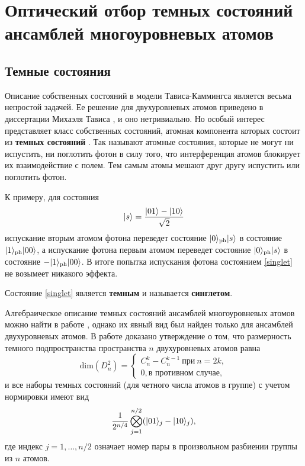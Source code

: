 \chapter{Оптический отбор темных состояний ансамблей многоуровневых атомов}\label{ch:ch3}

\section{Темные состояния}\label{subsec:ch3/sect1}

Описание собственных состояний в модели Тависа-Каммингса является весьма непростой задачей. Ее решение для двухуровневых атомов приведено в диссертации Михаэля Тависа \cite{tc_a_study}, и оно нетривиально. Но особый интерес представляет класс собственных состояний, атомная компонента которых состоит из \textbf{темных состояний} \cite{dark_states_dimension}. Так называют атомные состояния, которые не могут ни испустить, ни поглотить фотон в силу того, что интерференция атомов блокирует их взаимодействие с полем. Тем самым атомы мешают друг другу испустить или поглотить фотон.

К примеру, для состояния
\begin{equation}\label{singlet}
	|s\rangle = \frac{|01\rangle - |10\rangle}{\sqrt{2}}
\end{equation}
испускание вторым атомом фотона переведет состояние  $|0\rangle_{\text{ph}}|s\rangle$ в состояние $|1\rangle_{\text{ph}}|00\rangle$, а испускание фотона первым атомом переведет состояние  $|0\rangle_{\text{ph}}|s\rangle$ в состояние $-|1\rangle_{\text{ph}}|00\rangle$. В итоге попытка испускания фотона состоянием \eqref{singlet} не возымеет никакого эффекта.

Состояние \eqref{singlet} является \textbf{темным} и называется \textbf{синглетом}.

Алгебраическое описание темных состояний ансамблей многоуровневых атомов можно найти в работе \cite{dark_states_kok}, однако их явный вид был найден только для ансамблей двухуровневых атомов. В работе \cite{dark_states_dimension} доказано утверждение о том, что размерность темного подпространства пространства $n$ двухуровневых атомов равна
\[
\mathrm{dim}(D_{n}^2) =
\begin{cases}
	C_{n}^{k} - C_{n}^{k-1}~\text{при}~n = 2k, \\
	0, \text{в противном случае},
\end{cases}
\]
и все наборы темных состояний (для четного числа атомов в группе) с учетом нормировки имеют вид 
\[
\frac{1}{2^{n/4}}\bigotimes_{j=1}^{n/2}(|01\rangle_{j}-|10\rangle_{j}),
\]
где индекс $j = 1,\dots, n/2$ означает номер пары в произвольном разбиении группы из $n$ атомов.

